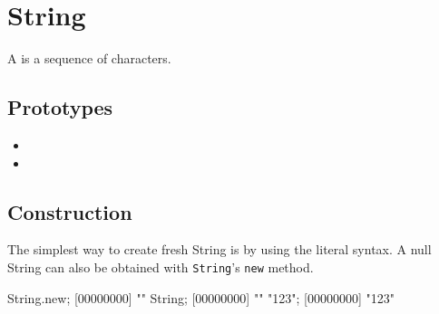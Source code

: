 \section{String}

A  is a sequence of characters.

\subsection{Prototypes}
\begin{itemize}
\item {}
\item {}
\end{itemize}

\subsection{Construction}
The simplest way to create fresh String is by using the literal
syntax. A null String can also be obtained with \lstinline|String|'s
\lstinline|new| method.

\begin{urbiscript}
String.new;
[00000000] ""
String;
[00000000] ""
"123";
[00000000] "123"
\end{urbiscript}

